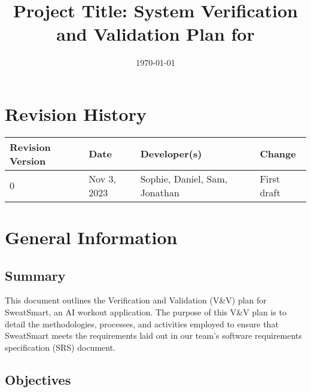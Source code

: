 \documentclass[12pt, titlepage]{article}
\begin{document}
    \title{Project Title: System Verification and Validation Plan for \progname{}}
    \author{\authname}
    \date{\today}

    \maketitle


    \section*{Revision History}

    \begin{table}[hp]
        \centering
        \begin{tabularx}{\textwidth}{lllX}
            \toprule
            \textbf{Revision Version} & \textbf{Date} & \textbf{Developer(s)} & \textbf{Change}\\
            \midrule
            0 & Nov 3, 2023 & Sophie, Daniel, Sam, Jonathan & First draft\\
            \bottomrule
        \end{tabularx}
    \end{table}

    \newpage

    \tableofcontents

    \listoftables


    \newpage

    \section{General Information}

    \subsection{Summary}

    This document outlines the Verification and Validation (V\&V) plan for SweatSmart, an AI workout application. The purpose of this V\&V plan is to detail the methodologies, processes, and activities employed to ensure that SweatSmart meets the requirements laid out in our team’s software requirements specification (SRS) document.

    \subsection{Objectives}
\end{document}
